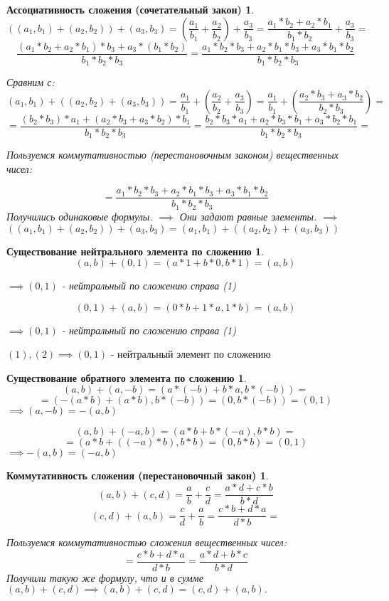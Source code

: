 \documentclass[14pt,a4paper,oneside,russian]{article}
\newtheorem*{axiom1}{Ассоциативность сложения (сочетательный закон)}
\newtheorem*{axiom2}{Существование нейтрального элемента по сложению}
\newtheorem*{axiom3}{Существование обратного элемента по сложению}
\newtheorem*{axiom4}{Коммутативность сложения (перестановочный закон)}
\begin{document}
\begin{axiom1}
$$
((a_1, b_1) + (a_2, b_2)) + (a_3, b_3) =
(\frac{a_1}{b_1} + \frac{a_2}{b_2}) + \frac{a_3}{b_3} =
\frac{a_1 * b_2 + a_2 * b_1}{b_1 * b_2} + \frac{a_3}{b_3} =
$$
$$
\frac{(a_1 * b_2 + a_2 * b_1) * b_3 + a_3 * (b_1 * b_2)}{b_1 * b_2 * b_3} =
\frac{a_1 * b_2 * b_3 + a_2 * b_1 * b_3 + a_3 * b_1 * b_2}{b_1 * b_2 * b_3}
$$

Сравним с:
$$
( a_1, b_1 ) + (( a_2, b_2 ) + ( a_3, b_3 )) =
\frac{a_1}{b_1} + (\frac{a_2}{b_2} + \frac{a_3}{b_3}) =
\frac{a_1}{b_1} + (\frac{a_2 * b_3 + a_3 * b_2}{b_2 * b_3}) =
$$
$$
= \frac{(b_2 * b_3) * a_1 + (a_2 * b_3 + a_3 * b_2) * b_1}{b_1 * b_2 * b_3} =
\frac{b_2 * b_3 * a_1 + a_2 * b_3 * b_1 + a_3 * b_2 * b_1}{b_1 * b_2 * b_3} =
$$

Пользуемся коммутативностью (перестановочным законом) вещественных чисел:

$$
= \frac{a_1 * b_2 * b_3 + a_2 * b_1 * b_3 + a_3 * b_1 * b_2}{b_1 * b_2 * b_3}
$$
Получились одинаковые формулы.
$ \implies $
Они задают равные элементы.
$ \implies $
$
((a_1, b_1) + (a_2, b_2)) + (a_3, b_3) =
(a_1, b_1) + ((a_2, b_2) + (a_3, b_3))
$
\end{axiom1}
\newpage

\begin{axiom2}
$$ (a, b) + (0, 1) = (a * 1 + b * 0, b * 1) = (a, b) $$
\begin{center}
$ \implies (0, 1) $ - нейтральный по сложению справа (1)
\end{center}
$$ (0, 1) + (a, b) = (0 * b + 1 * a, 1 * b) = (a, b) $$
\begin{center}
$ \implies (0, 1) $ - нейтральный по сложению справа (1)
\end{center}
\end{axiom2}

$ (1), (2) \implies (0, 1) $ - нейтральный элемент по сложению
\newpage

\begin{axiom3}
$$ (a, b) + (a, -b) = (a * (-b) + b * a, b * (-b)) = $$
$$ = ( -(a * b) + (a * b), b * (-b) ) = (0, b * (-b)) = (0, 1) $$
$ \implies (a, -b) = -(a, b) $

$$ (a, b) + (-a, b) = (a * b + b * (-a), b * b) = $$
$$ = (a * b + ((-a) * b), b * b) = (0, b * b) = (0, 1) $$
$ \implies -(a, b) = (-a, b) $
\end{axiom3}
\newpage

\begin{axiom4}
$$ (a, b) + (c , d) = \frac{a}{b} + \frac{c}{d} = \frac{a * d + c * b}{b * d} $$
$$ (c, d) + (a, b) = \frac{c}{d} + \frac{a}{b} = \frac{c * b + d * a}{d * b} = $$

Пользуемся коммутативностью сложения вещественных чисел:
$$ = \frac{c * b + d * a}{d * b} = \frac{a * d + b * c}{b * d} $$
Получили такую же формулу, что и в сумме $ (a, b) + (c,d) \implies (a, b) + (c,d) = (c, d) + (a, b). $
\end{axiom4}
\newpage
\end{document}
